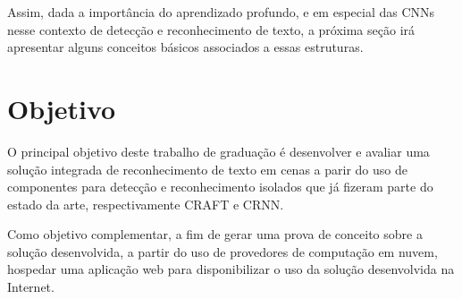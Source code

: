 Assim, dada a importância do aprendizado profundo, e em especial das CNNs nesse contexto de detecção e reconhecimento de texto, a próxima seção irá apresentar alguns conceitos básicos associados a essas estruturas.

\section{Objetivo}

O principal objetivo deste trabalho de graduação é desenvolver e avaliar uma solução integrada de reconhecimento de texto em cenas a parir do uso de componentes para detecção e reconhecimento isolados que já fizeram parte do estado da arte, respectivamente CRAFT e CRNN.

Como objetivo complementar, a fim de gerar uma prova de conceito sobre a solução desenvolvida, a partir do uso de provedores de computação em nuvem, hospedar uma aplicação web para disponibilizar o uso da solução desenvolvida na Internet.

